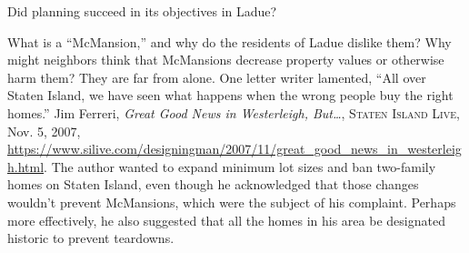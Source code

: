 
\item Did planning succeed in its objectives in Ladue?

\item
What is a ``McMansion,'' and why do the residents of Ladue dislike them? Why
might neighbors think that McMansions decrease property values or otherwise harm
them? They are far from alone. One letter writer lamented, ``All over Staten
Island, we have seen what happens when the wrong people buy the right homes.''
Jim Ferreri, \textit{Great Good News in Westerleigh, But\ldots}, \textsc{Staten
Island Live}, Nov. 5, 2007,
\url{https://www.silive.com/designingman/2007/11/great_good_news_in_westerleigh.html}.
The author wanted to expand minimum lot sizes
and ban two-family homes on Staten Island, even though he acknowledged that
those changes wouldn't prevent McMansions, which were the subject of his
complaint. Perhaps more effectively, he also suggested that all the homes in his
area be designated historic to prevent teardowns.

